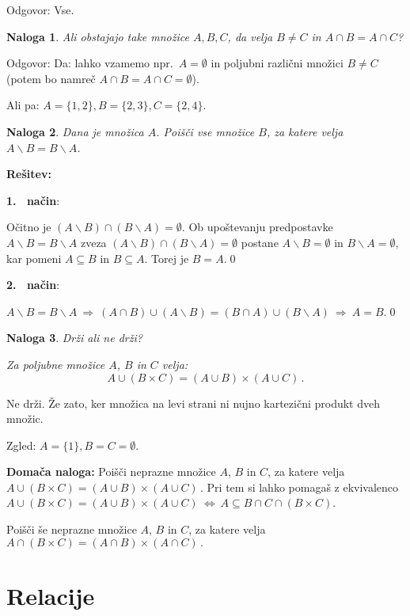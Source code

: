 \documentclass[11pt,paper=b5,footinclude,headinclude]{scrbook} %
\def\sledi {{~\Rightarrow~}}
\def\cee {{~\Leftrightarrow~}}
\newtheorem*{problem}{Naloga}
\begin{document}
Odgovor: Vse.

\bigskip
\begin{problem}
Ali obstajajo take množice $A, B, C$, da velja $B\neq C$ in $A\cap B = A\cap C$?
\end{problem}

Odgovor: Da: lahko vzamemo npr.~$A = \emptyset$ in poljubni različni množici $B\neq C$
(potem bo namreč $A\cap B = A\cap C = \emptyset$).

Ali pa: $A = \{1,2\}, B = \{2,3\}, C = \{2,4\}$.


\begin{problem}
Dana je množica $A$. Poišči vse množice $B$, za katere velja
$A\backslash B = B\backslash A$.
\end{problem}

\textbf{Rešitev:}

\textbf{1.~ način}:

Očitno je
$(A\backslash B) \cap (B\backslash A)=\emptyset$.
Ob upoštevanju predpostavke $A\backslash B = B\backslash A$
zveza
$(A\backslash B) \cap (B\backslash A)=\emptyset$
postane
$A\backslash B =\emptyset$
in $B\backslash A =\emptyset$, kar pomeni
$A\subseteq B$ in $B\subseteq A$. Torej je $B = A$.\qed

\textbf{2.~ način}:

$A\backslash B = B\backslash A \sledi(A\cap B)\cup (A\backslash B) = (B\cap A)\cup (B\backslash A) \sledi A = B$.\qed

\begin{problem}
Drži ali ne drži?

Za poljubne množice $A$, $B$ in $C$ velja:
$$A\cup (B\times C) = (A\cup B)\times (A\cup C)\,.$$
\end{problem}

Ne drži. Že zato, ker množica na levi strani ni nujno kartezični produkt dveh množic.

Zgled: $A = \{1\}, B = C = \emptyset$.

\medskip
\textbf{Domača naloga:}
Poišči neprazne množice $A$, $B$ in $C$, za katere velja
$A\cup (B\times C) = (A\cup B)\times (A\cup C)\,.$ Pri tem si lahko pomagaš z ekvivalenco
$A\cup (B\times C) = (A\cup B)\times (A\cup C)\cee A\subseteq B\cap C\cap (B\times C)$.

Poišči še neprazne množice $A$, $B$ in $C$, za katere velja
$A\cap (B\times C) = (A\cap B)\times (A\cap C)\,.$


\chapter{Relacije}
\end{document}
